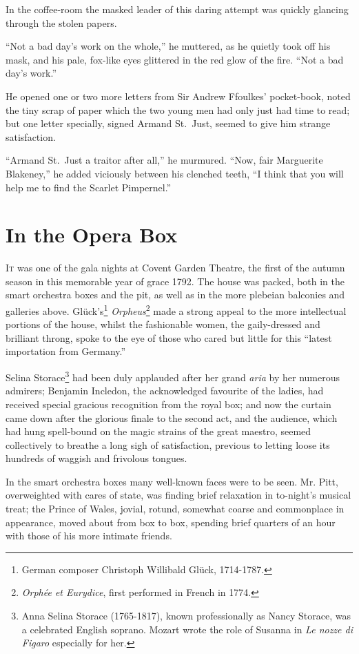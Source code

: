 \documentclass[paper=5.5in:8.5in,BCOR=7mm,twoside,DIV=calc,12pt,usegeometry,chapterprefix,endperiod,headings=big]{scrbook}
\begin{document}
In the coffee-room the masked leader of this daring attempt was quickly glancing through the stolen papers.

\enquote{Not a bad day's work on the whole,} he muttered, as he quietly took off his mask, and his pale, fox-like eyes glittered in the red glow of the fire. \enquote{Not a bad day's work.}

He opened one or two more letters from Sir Andrew Ffoulkes’ pocket-book, noted the tiny scrap of paper which the two young men had only just had time to read; but one letter specially, signed Armand St.~Just, seemed to give him strange satisfaction.

\enquote{Armand St.~Just a traitor after all,} he murmured. \enquote{Now, fair Marguerite Blakeney,} he added viciously between his clenched teeth, \enquote{I think that you will help me to find the Scarlet Pimpernel.}

\chapter{In the Opera Box}
\lettrine[lines=4]{I}{t} was one of the gala nights at Covent Garden Theatre, the first of the autumn season in this memorable year of grace 1792. The house was packed, both in the smart orchestra boxes and the pit, as well as in the more plebeian balconies and galleries above. Glück's\footnote{German composer Christoph Willibald Glück, 1714-1787.} \textit{Orpheus}\footnote{\textit{Orphée et Eurydice}, first performed in French in 1774.} made a strong appeal to the more intellectual portions of the house, whilst the fashionable women, the gaily-dressed and brilliant throng, spoke to the eye of those who cared but little for this \enquote{latest importation from Germany.}

Selina Storace\footnote{Anna Selina Storace (1765-1817), known professionally as Nancy Storace, was a celebrated English soprano. Mozart wrote the role of Susanna in \textit{Le nozze di Figaro} especially for her.} had been duly applauded after her grand \textit{aria} by her numerous admirers; Benjamin Incledon, the acknowledged favourite of the ladies, had received special gracious recognition from the royal box; and now the curtain came down after the glorious finale to the second act, and the audience, which had hung spell-bound on the magic strains of the great maestro, seemed collectively to breathe a long sigh of satisfaction, previous to letting loose its hundreds of waggish and frivolous tongues.

In the smart orchestra boxes many well-known faces were to be seen. Mr. Pitt, overweighted with cares of state, was finding brief relaxation in to-night's musical treat; the Prince of Wales, jovial, rotund, somewhat coarse and commonplace in appearance, moved about from box to box, spending brief quarters of an hour with those of his more intimate friends.
\end{document}
